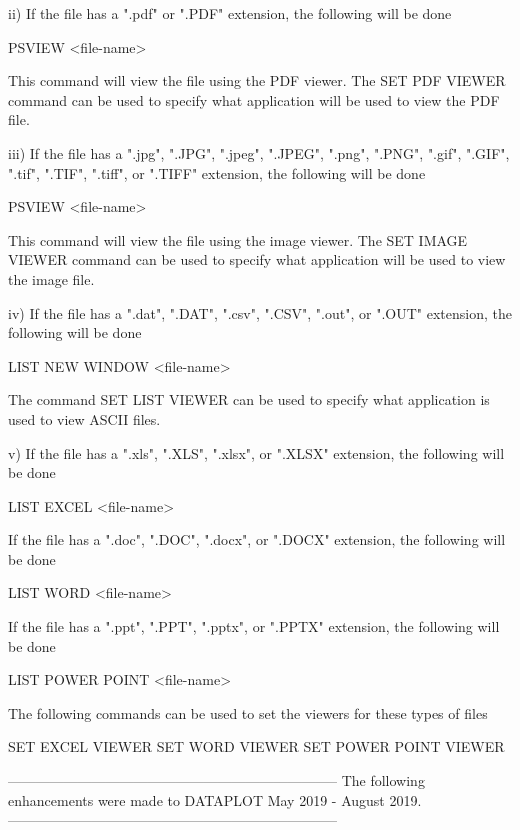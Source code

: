           ii) If the file has a ".pdf" or ".PDF" extension, the following
              will be done

                  PSVIEW  <file-name>

              This command will view the file using the PDF viewer.  The
              SET PDF VIEWER command can be used to specify what
              application will be used to view the PDF file.

         iii) If the file has a ".jpg", ".JPG", ".jpeg", ".JPEG", ".png",
              ".PNG", ".gif", ".GIF", ".tif", ".TIF", ".tiff",  or ".TIFF"
              extension, the following will be done

                  PSVIEW  <file-name>

              This command will view the file using the image viewer.  The
              SET IMAGE VIEWER command can be used to specify what
              application will be used to view the image file.

          iv) If the file has a ".dat", ".DAT", ".csv", ".CSV", ".out",
              or ".OUT" extension, the following will be done

                  LIST NEW WINDOW  <file-name>

              The command SET LIST VIEWER can be used to specify what
              application is used to view ASCII files.

           v) If the file has a ".xls", ".XLS", ".xlsx", or ".XLSX"
              extension, the following will be done

                  LIST EXCEL  <file-name>

              If the file has a ".doc", ".DOC", ".docx", or ".DOCX"
              extension, the following will be done

                  LIST WORD  <file-name>

              If the file has a ".ppt", ".PPT", ".pptx", or ".PPTX"
              extension, the following will be done

                  LIST POWER POINT  <file-name>

              The following commands can be used to set the viewers
              for these types of files

                  SET EXCEL VIEWER
                  SET WORD VIEWER
                  SET POWER POINT VIEWER

-----------------------------------------------------------------------
The following enhancements were made to DATAPLOT
May 2019 - August 2019.
-----------------------------------------------------------------------

